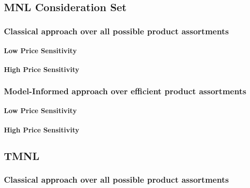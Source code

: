 \subsection{MNL Consideration Set}

\subsubsection{Classical approach over all possible product assortments}

\paragraph{Low Price Sensitivity}



\paragraph{High Price Sensitivity}



\subsubsection{Model-Informed approach over efficient product assortments}

\paragraph{Low Price Sensitivity}



\paragraph{High Price Sensitivity}



\subsection{TMNL}

\subsubsection{Classical approach over all possible product assortments}

